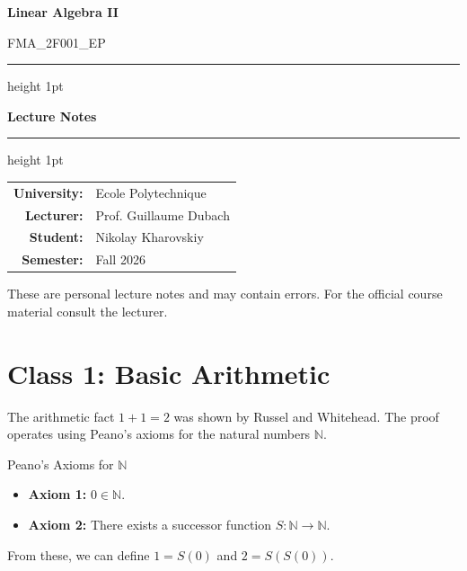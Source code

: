 \documentclass[11pt, a4paper]{article}
\newcommand{\N}{\mathbb{N}}
\newcommand{\CourseName}{Linear Algebra II}
\newcommand{\CourseCode}{FMA\_2F001\_EP}
\newcommand{\University}{Ecole Polytechnique}
\newcommand{\Lecturer}{Prof. Guillaume Dubach}
\newcommand{\StudentName}{Nikolay Kharovskiy}
\newcommand{\Semester}{Fall 2026}
\begin{document}
\begin{titlepage}
  \centering
  \vspace*{2cm}

  {\Huge\bfseries \CourseName \par}
  \vspace{0.5cm}
  {\large \CourseCode \par}

  \vspace{1.5cm}
  \hrule height 1pt
  \vspace{0.4cm}
  {\Large\bfseries Lecture Notes \par}
  \vspace{0.4cm}
  \hrule height 1pt

  \vspace{2cm}

  \begin{tabular}{rl}
    \textbf{University:} & \University \\[4pt]
    \textbf{Lecturer:}   & \Lecturer   \\[4pt]
    \textbf{Student:}    & \StudentName \\[4pt]
    \textbf{Semester:}   & \Semester   \\[4pt]
  \end{tabular}

  \vfill

  {\small These are personal lecture notes and may contain errors.
         For the official course material consult the lecturer.}
\end{titlepage}

\tableofcontents
\newpage

\section{Class 1: Basic Arithmetic}

The arithmetic fact $1+1=2$ was shown by Russel and Whitehead. The proof operates using Peano's axioms for the natural numbers $\N$.

\begin{theorem}{Peano's Axioms for $\N$}{}
\begin{itemize}
    \item \textbf{Axiom 1:} $0 \in \N$.
    \item \textbf{Axiom 2:} There exists a successor function $S: \N \rightarrow \N$.
\end{itemize}
From these, we can define $1=S(0)$ and $2=S(S(0))$.
\end{theorem}
\end{document}
